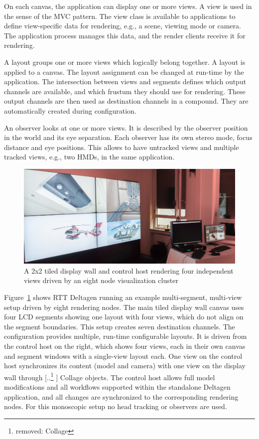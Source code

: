 \documentclass[10pt,journal,compsoc]{IEEEtran}
\newcommand{\fig}[1]{Figure~\ref{#1}}
\providecommand{\DIFaddtex}[1]{{\protect\color{blue} \sf #1}} %
\providecommand{\DIFdeltex}[1]{{\protect\color{red} [..\footnote{removed: #1} ]}} %
\providecommand{\DIFaddbegin}{} %
\providecommand{\DIFaddend}{} %
\providecommand{\DIFdelbegin}{} %
\providecommand{\DIFdelend}{} %
\providecommand{\DIFadd}[1]{\texorpdfstring{\DIFaddtex{#1}}{#1}} %
\providecommand{\DIFdel}[1]{\texorpdfstring{\DIFdeltex{#1}}{}} %
\newcommand{\DIFscaledelfig}{0.5}
\newlength{\DIFdelgraphicswidth} %
\newlength{\DIFdelgraphicsheight} %
\newcommand{\DIFaddincludegraphics}[2][]{{\color{blue}\fbox{\DIFOincludegraphics[#1]{#2}}}} %
\newcommand{\DIFdelincludegraphics}[2][]{%
\sbox{\DIFdelgraphicsbox}{\DIFOincludegraphics[#1]{#2}}%
\settoboxwidth{\DIFdelgraphicswidth}{\DIFdelgraphicsbox} %
\settoboxtotalheight{\DIFdelgraphicsheight}{\DIFdelgraphicsbox} %
\scalebox{\DIFscaledelfig}{%
\parbox[b]{\DIFdelgraphicswidth}{\usebox{\DIFdelgraphicsbox}\\[-\baselineskip] \rule{\DIFdelgraphicswidth}{0em}}\llap{\resizebox{\DIFdelgraphicswidth}{\DIFdelgraphicsheight}{%
\setlength{\unitlength}{\DIFdelgraphicswidth}%
\begin{picture}(1,1)%
\thicklines\linethickness{2pt} %
{\color[rgb]{1,0,0}\put(0,0){\framebox(1,1){}}}%
{\color[rgb]{1,0,0}\put(0,0){\line( 1,1){1}}}%
{\color[rgb]{1,0,0}\put(0,1){\line(1,-1){1}}}%
\end{picture}%
}\hspace*{3pt}}} %
} %
\DeclareRobustCommand{\DIFaddbegin}{\DIFOaddbegin \let\includegraphics\DIFaddincludegraphics} %
\DeclareRobustCommand{\DIFaddend}{\DIFOaddend \let\includegraphics\DIFOincludegraphics} %
\DeclareRobustCommand{\DIFdelbegin}{\DIFOdelbegin \let\includegraphics\DIFdelincludegraphics} %
\DeclareRobustCommand{\DIFdelend}{\DIFOaddend \let\includegraphics\DIFOincludegraphics} %
\begin{document}
On each canvas, the application can display one or more views. A view is used in
the sense of the MVC pattern. The view class is available to applications to
define view-specific data for rendering, e.g., a scene, viewing mode or camera.
The application process manages this data, and the render clients receive it for
rendering.

A layout groups one or more views which logically belong together. A layout is
applied to a canvas. The layout assignment can be changed at run-time by the
application. The intersection between views and segments defines which output
channels are available, and which frustum they should use for rendering. These
output channels are then used as destination channels in a compound. They are
automatically created during configuration.

\label{sec:observer}
An observer looks at one or more views. It is described by the observer position
in the world and its eye separation. Each observer has its own stereo
mode, focus distance and eye positions. This allows to have untracked
views and multiple tracked views, e.g., two HMDs, in the same application.

\begin{figure}[ht]\center
  \includegraphics[width=\columnwidth]{images/layout}
  \caption{\label{fLayout}A 2x2 tiled display wall and control host rendering four independent views driven by an eight node visualization cluster}
\end{figure}

\fig{fLayout} shows RTT Deltagen running an example multi-segment, multi-view
setup driven by eight rendering nodes. The main tiled display wall canvas uses
four LCD segments showing one layout with four views, which do not align on the
segment boundaries. This setup creates seven destination channels. The
configuration provides multiple, run-time configurable layouts. It is driven
from the control host on the right, which shows four views, each in their own
canvas and segment windows with a single-view layout each. One view on the
control host synchronizes its content (model and camera) with one view on the
display wall through \DIFdelbegin \DIFdel{Collage }\DIFdelend \DIFaddbegin \DIFadd{\textsf{Collage} }\DIFaddend objects. The control host allows full
model modifications and all workflows supported within the standalone Deltagen
application, and all changes are synchronized to the corresponding rendering
nodes. For this monoscopic setup no head tracking or observers are used.
\end{document}
